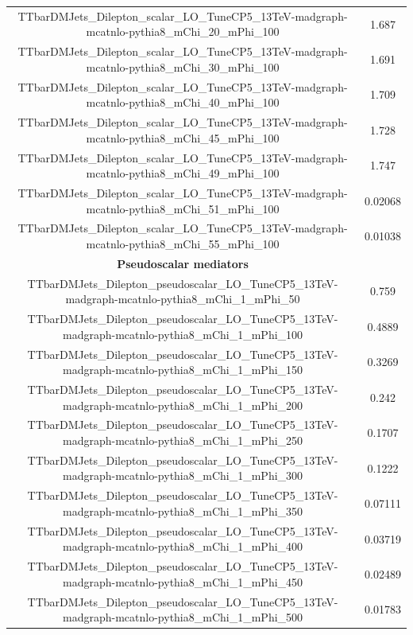 \documentclass[a4paper, 10pt, openright]{report}
\begin{document}
\begin{appendices}
\begin{table}
\begin{center}
{\begin{tabular}{ c|c }
 TTbarDMJets\_Dilepton\_scalar\_LO\_TuneCP5\_13TeV-madgraph-mcatnlo-pythia8\_mChi\_20\_mPhi\_100 & 1.687 \\
 TTbarDMJets\_Dilepton\_scalar\_LO\_TuneCP5\_13TeV-madgraph-mcatnlo-pythia8\_mChi\_30\_mPhi\_100 & 1.691 \\
 TTbarDMJets\_Dilepton\_scalar\_LO\_TuneCP5\_13TeV-madgraph-mcatnlo-pythia8\_mChi\_40\_mPhi\_100 & 1.709 \\
 TTbarDMJets\_Dilepton\_scalar\_LO\_TuneCP5\_13TeV-madgraph-mcatnlo-pythia8\_mChi\_45\_mPhi\_100 & 1.728 \\
 TTbarDMJets\_Dilepton\_scalar\_LO\_TuneCP5\_13TeV-madgraph-mcatnlo-pythia8\_mChi\_49\_mPhi\_100 & 1.747 \\
 TTbarDMJets\_Dilepton\_scalar\_LO\_TuneCP5\_13TeV-madgraph-mcatnlo-pythia8\_mChi\_51\_mPhi\_100 & 0.02068 \\
 TTbarDMJets\_Dilepton\_scalar\_LO\_TuneCP5\_13TeV-madgraph-mcatnlo-pythia8\_mChi\_55\_mPhi\_100 & 0.01038 \\
 \hline
\textbf{Pseudoscalar mediators} & \\
 TTbarDMJets\_Dilepton\_pseudoscalar\_LO\_TuneCP5\_13TeV-madgraph-mcatnlo-pythia8\_mChi\_1\_mPhi\_50 & 0.759 \\
 TTbarDMJets\_Dilepton\_pseudoscalar\_LO\_TuneCP5\_13TeV-madgraph-mcatnlo-pythia8\_mChi\_1\_mPhi\_100 & 0.4889 \\
 TTbarDMJets\_Dilepton\_pseudoscalar\_LO\_TuneCP5\_13TeV-madgraph-mcatnlo-pythia8\_mChi\_1\_mPhi\_150 & 0.3269 \\
 TTbarDMJets\_Dilepton\_pseudoscalar\_LO\_TuneCP5\_13TeV-madgraph-mcatnlo-pythia8\_mChi\_1\_mPhi\_200 & 0.242 \\
 TTbarDMJets\_Dilepton\_pseudoscalar\_LO\_TuneCP5\_13TeV-madgraph-mcatnlo-pythia8\_mChi\_1\_mPhi\_250 & 0.1707 \\
 TTbarDMJets\_Dilepton\_pseudoscalar\_LO\_TuneCP5\_13TeV-madgraph-mcatnlo-pythia8\_mChi\_1\_mPhi\_300 & 0.1222 \\
 TTbarDMJets\_Dilepton\_pseudoscalar\_LO\_TuneCP5\_13TeV-madgraph-mcatnlo-pythia8\_mChi\_1\_mPhi\_350 & 0.07111 \\
 TTbarDMJets\_Dilepton\_pseudoscalar\_LO\_TuneCP5\_13TeV-madgraph-mcatnlo-pythia8\_mChi\_1\_mPhi\_400 & 0.03719 \\
 TTbarDMJets\_Dilepton\_pseudoscalar\_LO\_TuneCP5\_13TeV-madgraph-mcatnlo-pythia8\_mChi\_1\_mPhi\_450 & 0.02489 \\
 TTbarDMJets\_Dilepton\_pseudoscalar\_LO\_TuneCP5\_13TeV-madgraph-mcatnlo-pythia8\_mChi\_1\_mPhi\_500 & 0.01783 \\

\end{tabular}}
\end{center}
\end{table}
\end{appendices}
\end{document}
